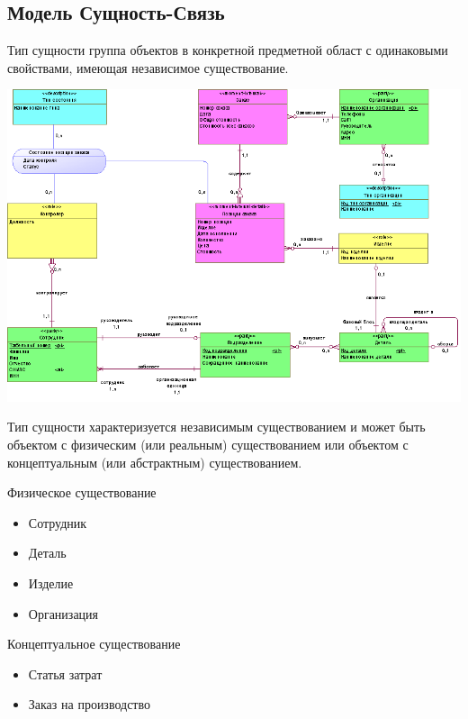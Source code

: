 \documentclass{beamer}
\begin{document}
\subsection{Модель Сущность-Связь}
\begin{frame}
\begin{block}{Тип сущности}
группа объектов в конкретной предметной област с одинаковыми свойствами, имеющая независимое существование.
\end{block}
\begin{center}
\includegraphics[scale=0.45]{images/shema-er.png}
\end{center}
\end{frame}

\begin{frame}
Тип сущности характеризуется независимым существованием и может быть объектом с физическим  (или реальным) существованием или объектом с концептуальным (или абстрактным)  существованием.
\begin{block}{Физическое существование}
\begin{itemize}
\item Сотрудник
\item Деталь
\item Изделие
\item Организация
\end{itemize}
\end{block}
\begin{block}{Концептуальное существование}
\begin{itemize}
\item Статья затрат
\item Заказ на производство
\end{itemize}
\end{block}
\end{frame}
\end{document}
